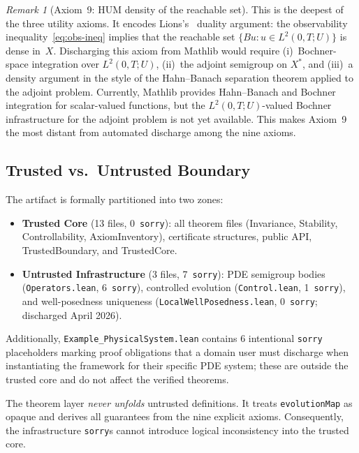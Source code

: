 \documentclass[11pt,a4paper]{article}
\theoremstyle{plain}
\theoremstyle{definition}
\theoremstyle{remark}
\newtheorem{remark}[theorem]{Remark}
\newcommand{\sorry}{\texttt{sorry}}
\newcommand{\leaninline}[1]{\texttt{#1}}
\begin{document}
\begin{remark}[Axiom~9: HUM density of the reachable set]\label{rem:ax9}
This is the deepest of the three utility axioms.  It encodes
Lions's~\cite{Lions1988} duality argument: the observability
inequality~\eqref{eq:obs-ineq} implies that the reachable set
$\{Bu : u \in L^2(0,T; U)\}$ is dense in~$X$.  Discharging this axiom
from Mathlib would require (i)~Bochner-space integration over
$L^2(0,T; U)$, (ii)~the adjoint semigroup on $X^*$, and
(iii)~a density argument in the style of the Hahn--Banach separation
theorem applied to the adjoint problem.  Currently, Mathlib provides
Hahn--Banach and Bochner integration for scalar-valued functions, but
the $L^2(0,T; U)$-valued Bochner infrastructure for the adjoint
problem is not yet available.  This makes Axiom~9 the most distant
from automated discharge among the nine axioms.
\end{remark}

\subsection{Trusted vs.\ Untrusted Boundary}\label{sec:boundary}

The artifact is formally partitioned into two zones:

\begin{itemize}
  \item \textbf{Trusted Core} (13 files, 0~\sorry{}):
    all theorem files (Invariance, Stability, Controllability,
    AxiomInventory), certificate structures, public API,
    TrustedBoundary, and TrustedCore.
  \item \textbf{Untrusted Infrastructure} (3 files, 7~\sorry{}):
    PDE semigroup bodies (\texttt{Operators.lean}, 6~\sorry{}),
    controlled evolution (\texttt{Control.lean}, 1~\sorry{}), and
    well-posedness uniqueness (\texttt{LocalWellPosedness.lean}, 0~\sorry{}; discharged April 2026).
\end{itemize}

Additionally, \texttt{Example\_PhysicalSystem.lean} contains
6 intentional \sorry{} placeholders marking proof obligations
that a domain user must discharge when instantiating the
framework for their specific PDE system; these are outside
the trusted core and do not affect the verified theorems.

The theorem layer \emph{never unfolds} untrusted definitions.  It treats
\leaninline{evolutionMap} as opaque and derives all guarantees from the
nine explicit axioms.  Consequently, the infrastructure \sorry{}s cannot
introduce logical inconsistency into the trusted core.
\end{document}
